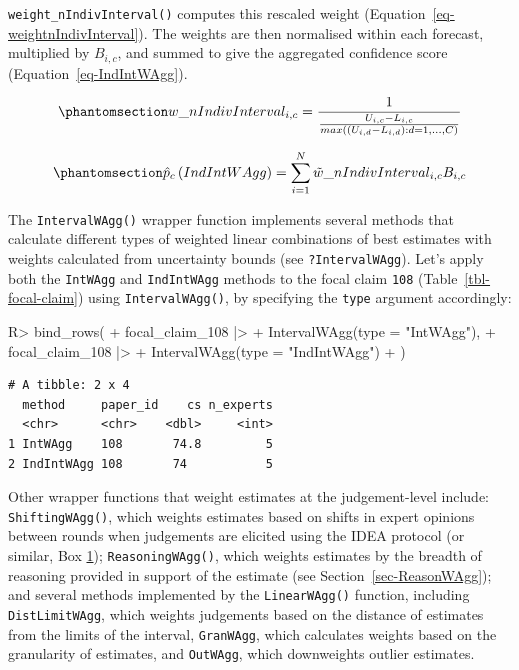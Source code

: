 \documentclass[
  11pt,
  a4paper,
]{article}
\newenvironment{Shaded}{\begin{snugshade}}{\end{snugshade}}
\newcommand{\AttributeTok}[1]{\textcolor[rgb]{0.40,0.45,0.13}{#1}}
\newcommand{\FunctionTok}[1]{\textcolor[rgb]{0.28,0.35,0.67}{#1}}
\newcommand{\NormalTok}[1]{\textcolor[rgb]{0.00,0.23,0.31}{#1}}
\newcommand{\SpecialCharTok}[1]{\textcolor[rgb]{0.37,0.37,0.37}{#1}}
\newcommand{\StringTok}[1]{\textcolor[rgb]{0.13,0.47,0.30}{#1}}
\begin{document}
\texttt{weight\_nIndivInterval()} computes this rescaled weight
(Equation~\ref{eq-weightnIndivInterval}). The weights are then
normalised within each forecast, multiplied by \(B_{i,c}\), and summed
to give the aggregated confidence score (Equation~\ref{eq-IndIntWAgg}).

\begin{equation}\protect\phantomsection\label{eq-weightnIndivInterval}{
w\_nIndivInterval_{i,c}= \frac{1}{\frac{U_{i,c} - L_{i,c}}{max({ (U_{i,d} - L_{i,d}): d = 1,\dots, C})}}
}\end{equation}

\begin{equation}\protect\phantomsection\label{eq-IndIntWAgg}{
\hat{p}_c\left( IndIntWAgg \right) = \sum_{i=1}^N \tilde{w}\_nIndivInterval_{i,c}B_{i,c}
}\end{equation}

The \texttt{IntervalWAgg()} wrapper function implements several methods
that calculate different types of weighted linear combinations of best
estimates with weights calculated from uncertainty bounds (see
\texttt{?IntervalWAgg}). Let's apply both the \texttt{IntWAgg} and
\texttt{IndIntWAgg} methods to the focal claim \texttt{108}
(Table~\ref{tbl-focal-claim}) using \texttt{IntervalWAgg()}, by
specifying the \texttt{type} argument accordingly:

\begin{Shaded}
\begin{Highlighting}[]
\NormalTok{R}\SpecialCharTok{\textgreater{}} \FunctionTok{bind\_rows}\NormalTok{(}
\SpecialCharTok{+}\NormalTok{    focal\_claim\_108 }\SpecialCharTok{|\textgreater{}}
\SpecialCharTok{+}      \FunctionTok{IntervalWAgg}\NormalTok{(}\AttributeTok{type =} \StringTok{"IntWAgg"}\NormalTok{),}
\SpecialCharTok{+}\NormalTok{    focal\_claim\_108 }\SpecialCharTok{|\textgreater{}}
\SpecialCharTok{+}      \FunctionTok{IntervalWAgg}\NormalTok{(}\AttributeTok{type =} \StringTok{"IndIntWAgg"}\NormalTok{)}
\SpecialCharTok{+}\NormalTok{  )}
\end{Highlighting}
\end{Shaded}

\begin{verbatim}
# A tibble: 2 x 4
  method     paper_id    cs n_experts
  <chr>      <chr>    <dbl>     <int>
1 IntWAgg    108       74.8         5
2 IndIntWAgg 108       74           5
\end{verbatim}

Other wrapper functions that weight estimates at the judgement-level
include: \texttt{ShiftingWAgg()}, which weights estimates based on
shifts in expert opinions between rounds when judgements are elicited
using the IDEA protocol (or similar, Box \hyperref[ideaProtocol]{1});
\texttt{ReasoningWAgg()}, which weights estimates by the breadth of
reasoning provided in support of the estimate (see
Section~\ref{sec-ReasonWAgg}); and several methods implemented by the
\texttt{LinearWAgg()} function, including \texttt{DistLimitWAgg}, which
weights judgements based on the distance of estimates from the limits of
the interval, \texttt{GranWAgg}, which calculates weights based on the
granularity of estimates, and \texttt{OutWAgg}, which downweights
outlier estimates.
\end{document}
